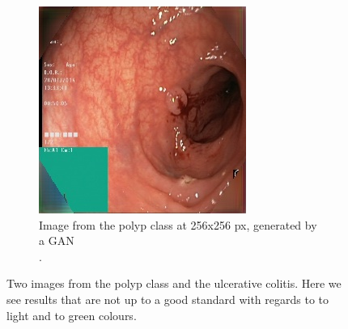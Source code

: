 \begin{figure}[t]
\begin{subfigure}[b]{0.4\textwidth}
            \includegraphics[width=\textwidth]{experiments/figures/blackcorner/polypwithgreenGAN.jpg}
            \caption[]%
            {{\small Image from the polyp class at 256x256 px, generated by a GAN\\. }}    
            \label{fig:zGANBLACK}
        \end{subfigure}
        \caption[ ]
        {\small Two images from the polyp class and the ulcerative colitis. Here we see results that are not up to a good standard with regards to to light and to green colours.} 
        \label{fig:BC2BLACK}
    \end{figure}

